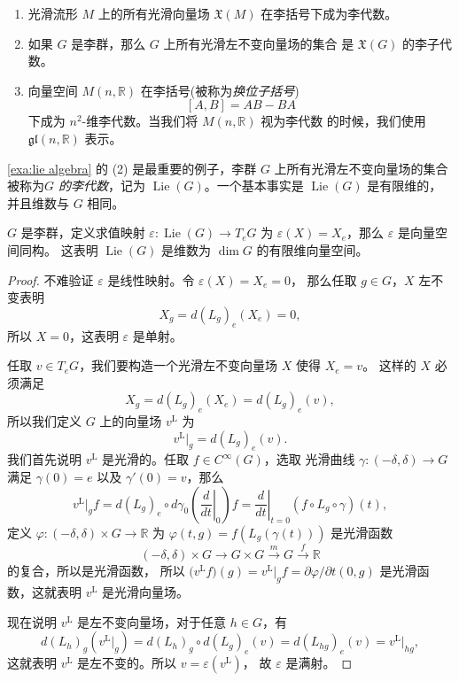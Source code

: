 \documentclass[fontset=none]{Notes}
\DeclareMathOperator\Lie{Lie}
\begin{document}
\begin{example}[李代数]\label{exa:lie algebra}
  \mbox{}
  \begin{enumerate}
    \item 光滑流形 $M$ 上的所有光滑向量场 $\mathfrak{X}(M)$
    在李括号下成为李代数。
    \item 如果 $G$ 是李群，那么 $G$ 上所有光滑左不变向量场的集合
    是 $\mathfrak{X}(G)$ 的李子代数。
    \item 向量空间 $M(n,\mathbb{R})$ 在李括号(被称为\emph{换位子括号})
    \[
      [A,B]=AB-BA  
    \]
    下成为 $n^2$-维李代数。当我们将 $M(n,\mathbb{R})$ 视为李代数
    的时候，我们使用 $\mathfrak{gl}(n,\mathbb{R})$ 表示。
  \end{enumerate}
\end{example}

\ref{exa:lie algebra} 的 (2) 是最重要的例子，李群 $G$ 上所有光滑左不变向量场的集合
被称为\emph{$G$ 的李代数}，记为 $\Lie(G)$。一个基本事实是 $\Lie(G)$
是有限维的，并且维数与 $G$ 相同。

\begin{theorem}\label{thm:dim of lie algebra}
  $G$ 是李群，定义求值映射 $\varepsilon:\Lie(G)\to T_eG$ 为
  $\varepsilon(X)=X_e$，那么 $\varepsilon$ 是向量空间同构。
  这表明 $\Lie(G)$ 是维数为 $\dim G$ 的有限维向量空间。
\end{theorem}
\begin{proof}
  不难验证 $\varepsilon$ 是线性映射。令 $\varepsilon(X)=X_e=0$，
  那么任取 $g\in G$，$X$ 左不变表明
  \[
    X_g=d(L_g)_e(X_e)=0,
  \]
  所以 $X=0$，这表明 $\varepsilon$ 是单射。

  任取 $v\in T_eG$，我们要构造一个光滑左不变向量场 $X$ 使得 $X_e=v$。
  这样的 $X$ 必须满足 
  \[
    X_g=d(L_g)_e(X_e)=d(L_g)_e(v),  
  \]
  所以我们定义 $G$ 上的向量场 $v^{\mathrm{L}}$ 为
  \[
    v^{\mathrm{L}}\big|_g=d(L_g)_e(v).
  \]
  我们首先说明 $v^{\mathrm{L}}$ 是光滑的。任取 $f\in C^\infty(G)$，选取
  光滑曲线 $\gamma:(-\delta,\delta)\to G$ 满足 $\gamma(0)=e$ 以及
  $\gamma'(0)=v$，那么
  \[
    v^{\mathrm{L}}\big|_gf=d(L_g)_e\circ d\gamma_0\left(\left.\frac{d}{dt}\right|_0\right)f
    =\left.\frac{d}{dt}\right|_{t=0}(f\circ L_g\circ\gamma)(t),
  \]
  定义 $\varphi:(-\delta,\delta)\times G\to \mathbb{R}$ 为
  $\varphi(t,g)=f(L_g(\gamma(t)))$ 是光滑函数
  \[
    (-\delta,\delta)\times G\to G\times G\xrightarrow{m} G\xrightarrow{f} \mathbb{R}
  \]
  的复合，所以是光滑函数，
  所以 $\bigl(v^{\mathrm{L}}f\bigr)(g)=v^{\mathrm{L}}\big|_gf=\partial\varphi/\partial t(0,g)$ 
  是光滑函数，这就表明 $v^{\mathrm{L}}$ 是光滑向量场。

  现在说明 $v^{\mathrm{L}}$ 是左不变向量场，对于任意 $h\in G$，有
  \[
      d(L_h)_{g}\left(v^{\mathrm{L}}\big|_g\right)
      =d(L_h)_g\circ d(L_g)_e(v)=d(L_{hg})_e(v)=
      v^{\mathrm{L}}\big|_{hg},
  \]
  这就表明 $v^{\mathrm{L}}$ 是左不变的。所以 $v=\varepsilon(v^{\mathrm{L}})$，
  故 $\varepsilon$ 是满射。
\end{proof}
\end{document}
